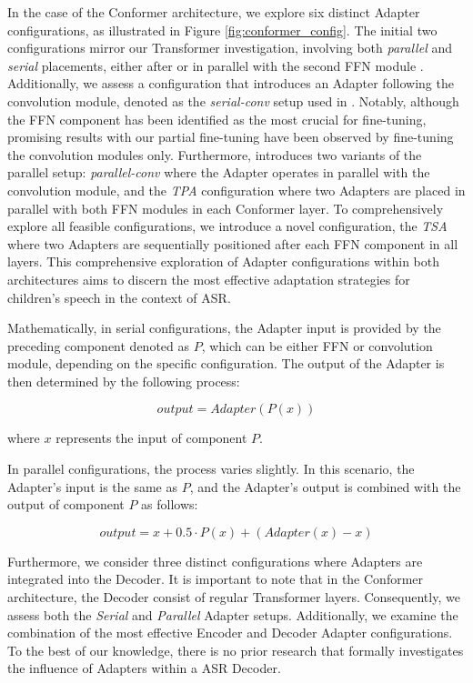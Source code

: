 In the case of the Conformer architecture, we explore six distinct Adapter configurations, as illustrated in Figure \ref{fig:conformer_config}. The initial two configurations mirror our Transformer investigation, involving both \textit{parallel} and \textit{serial} placements, either after or in parallel with the second \ac{FFN} module \cite{chen2023efficient}. Additionally, we assess a configuration that introduces an Adapter following the convolution module, denoted as the \textit{serial-conv} setup used in \cite{10095837}. Notably, although the \ac{FFN} component has been identified as the most crucial for fine-tuning, promising results with our partial fine-tuning have been observed by fine-tuning the convolution modules only. Furthermore, \cite{chen2023efficient} introduces two variants of the parallel setup: \textit{parallel-conv} where the Adapter operates in parallel with the convolution module, and the \textit{\ac{TPA}} configuration where two Adapters are placed in parallel with both \ac{FFN} modules in each Conformer layer. 
To comprehensively explore all feasible configurations, we introduce a novel configuration, the \textit{\ac{TSA}} where two Adapters are sequentially positioned after each \ac{FFN} component in all layers. 
This comprehensive exploration of Adapter configurations within both architectures aims to discern the most effective adaptation strategies for children's speech in the context of \ac{ASR}. 


Mathematically, in serial configurations, the Adapter input is provided by the preceding component denoted as $P$, which can be either \ac{FFN} or convolution module, depending on the specific configuration. The output of the Adapter is then determined by the following process:

\begin{equation}
    output =  Adapter(P(x))
\end{equation}

where $x$ represents the input of component $P$.

In parallel configurations, the process varies slightly. In this scenario, the Adapter's input is the same as $P$, and the Adapter's output is combined with the output of component $P$ as follows:

\begin{equation}
    output = x + 0.5 \cdot P(x) + (Adapter(x) - x)
\end{equation}

Furthermore, we consider three distinct configurations where Adapters are integrated into the Decoder. It is important to note that in the Conformer architecture, the Decoder consist of regular Transformer layers. Consequently, we assess both the \textit{Serial} and \textit{Parallel} Adapter setups. Additionally, we examine the combination of the most effective Encoder and Decoder Adapter configurations. To the best of our knowledge, there is no prior research that formally investigates the influence of Adapters within a \ac{ASR} Decoder. 

